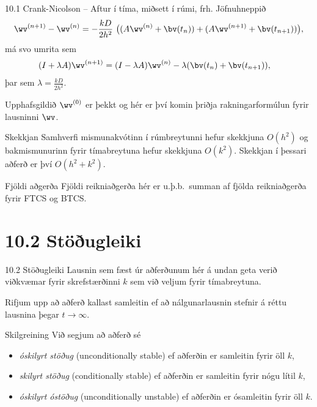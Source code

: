 \begin{frame}{10.1 Crank-Nicolson -- Aftur í tíma, miðsett í rúmi, frh.}
 Jöfnuhneppið
 $$ 
 \wv^{(n+1)} - \wv^{(n)} =  -\frac{kD}{2h^2}\  
 \big( (A\wv^{(n)} + \bv(t_{n})) +  
 (A\wv^{(n+1)} + \bv(t_{n+1})) \big), 
$$
má svo umrita sem
\begin{align*}
 (I+\lambda A)\wv^{(n+1)} &= (I-\lambda A) \wv^{(n)}  - \lambda (\bv(t_{n}) 
 + \bv(t_{n+1})), 
\end{align*}
þar sem $\lambda = \frac{kD}{2h^2}$. \pause
 
 Upphafsgildið $\wv^{(0)}$ er þekkt og hér er því komin þriðja rakningarformúlun
 fyrir lausninni $\wv$.  \pause
 
 \begin{block}{Skekkjan}
  Samhverfi mismunakvótinn í rúmbreytunni hefur skekkjuna
 $O(h^2)$ og bakmismunurinn fyrir tímabreytuna hefur skekkjuna $O(k^2)$. 
 Skekkjan í þessari aðferð er því $O(h^2 + k^2)$.
 \end{block}
 
 \begin{block}{Fjöldi aðgerða}
  Fjöldi reikniaðgerða hér er u.þ.b.~summan af fjölda reikniaðgerða fyrir FTCS og BTCS.
 \end{block}

 
 \end{frame}
 
 \section*{10.2 Stöðugleiki}
 
 \begin{frame}{10.2 Stöðugleiki}
  Lausnin sem fæst úr aðferðunum hér á undan geta verið viðkvæmar fyrir skrefstærðinni $k$  sem við 
  veljum fyrir tímabreytuna. \pause
  
  
  Rifjum upp að aðferð kallast samleitin ef að nálgunarlausnin stefnir á 
  réttu lausnina þegar $t\to \infty$.
  
  \pause
  \begin{block}{Skilgreining}
    Við segjum að aðferð sé
    \begin{itemize}
     \item \emph{óskilyrt stöðug} (unconditionally stable) ef aðferðin er samleitin fyrir öll $k$, \pause
     \item \emph{skilyrt stöðug} (conditionally stable) ef aðferðin er samleitin fyrir nógu lítil $k$,\pause
     \item \emph{óskilyrt óstöðug} (unconditionally unstable) ef aðferðin er ósamleitin fyrir öll $k$.
    \end{itemize}

  \end{block}

 \end{frame}
 
